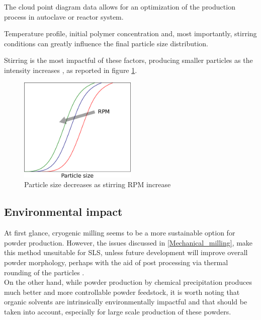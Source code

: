 \documentclass{article}
\begin{document}
    The cloud point diagram data allows for an optimization of the production process in autoclave or reactor system. 

    Temperature profile, initial polymer concentration and, most importantly, stirring conditions can greatly influence the final 
    particle size distribution. 
    
    Stirring is the most impactful of these factors, producing smaller particles as the intensity increases \autocites{DechetMaximilianA2020OtDo}, as reported in figure \ref{fig:stirring_rpm}. 

    \begin{figure}[h!]
        \centering
        \includegraphics[width=0.5\textwidth]{Pictures/particle_size_stirring.eps}
        \caption{Particle size decreases as stirring RPM increase \autocites{Inkscape}}
        \label{fig:stirring_rpm}
    \end{figure}

    \subsection{Environmental impact \label{Environmental_impact}}

    At first glance, cryogenic milling seems to be a more sustainable option for powder production. However, the issues discussed in \ref{Mechanical_milling}, 
    make this method unsuitable for SLS, unless future development will improve overall powder morphology, perhaps with the aid of 
    post processing via thermal rounding of the particles \autocite{DechetMaximilianA2020OtDo}. \\ 
    
    On the other hand, while powder production by 
    chemical precipitation produces much better and more 
    controllable powder feedstock, it is worth noting that organic solvents are intrinsically environmentally impactful and that should be taken 
    into account, especially for large scale production of these powders. 
\end{document}
